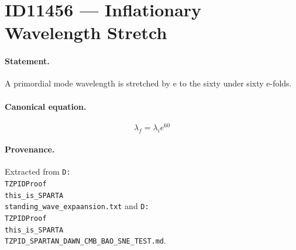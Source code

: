 \section*{ID11456 --- Inflationary Wavelength Stretch}

\paragraph{Statement.}
A primordial mode wavelength is stretched by e to the sixty under sixty e-folds.

\paragraph{Canonical equation.}
\[
\lambda_f=\lambda_i e^{60}
\]

\paragraph{Provenance.}
Extracted from \texttt{D:\\TZPIDProof\\this\_is\_SPARTA\\standing\_wave\_expaansion.txt} and \texttt{D:\\TZPIDProof\\this\_is\_SPARTA\\TZPID\_SPARTAN\_DAWN\_CMB\_BAO\_SNE\_TEST.md}.
